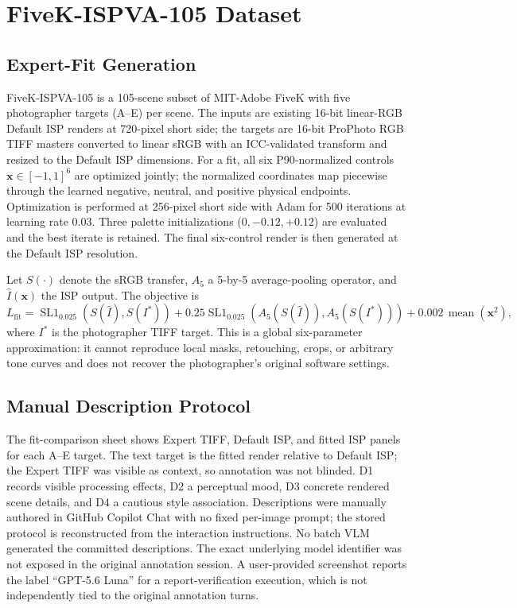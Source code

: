 \documentclass[journal]{IEEEtran}
\begin{document}
\section{FiveK-ISPVA-105 Dataset}
\subsection{Expert-Fit Generation}
FiveK-ISPVA-105 is a 105-scene subset of MIT-Adobe FiveK with five photographer targets (A--E) per scene. The inputs are existing 16-bit linear-RGB Default ISP renders at 720-pixel short side; the targets are 16-bit ProPhoto RGB TIFF masters converted to linear sRGB with an ICC-validated transform and resized to the Default ISP dimensions. For a fit, all six P90-normalized controls $\mathbf{x}\in[-1,1]^6$ are optimized jointly; the normalized coordinates map piecewise through the learned negative, neutral, and positive physical endpoints. Optimization is performed at 256-pixel short side with Adam for 500 iterations at learning rate 0.03. Three palette initializations ($0,-0.12,+0.12$) are evaluated and the best iterate is retained. The final six-control render is then generated at the Default ISP resolution.

Let $S(\cdot)$ denote the sRGB transfer, $A_5$ a 5-by-5 average-pooling operator, and $\hat I(\mathbf{x})$ the ISP output. The objective is
\begin{equation}
 L_{\mathrm{fit}}=\operatorname{SL1}_{0.025}(S(\hat I),S(I^*))
 +0.25\operatorname{SL1}_{0.025}(A_5(S(\hat I)),A_5(S(I^*)))
 +0.002\,\operatorname{mean}(\mathbf{x}^2),
\end{equation}
where $I^*$ is the photographer TIFF target. This is a global six-parameter approximation: it cannot reproduce local masks, retouching, crops, or arbitrary tone curves and does not recover the photographer's original software settings.

\subsection{Manual Description Protocol}
The fit-comparison sheet shows Expert TIFF, Default ISP, and fitted ISP panels for each A--E target. The text target is the fitted render relative to Default ISP; the Expert TIFF was visible as context, so annotation was not blinded. D1 records visible processing effects, D2 a perceptual mood, D3 concrete rendered scene details, and D4 a cautious style association. Descriptions were manually authored in GitHub Copilot Chat with no fixed per-image prompt; the stored protocol is reconstructed from the interaction instructions. No batch VLM generated the committed descriptions. The exact underlying model identifier was not exposed in the original annotation session. A user-provided screenshot reports the label ``GPT-5.6 Luna'' for a report-verification execution, which is not independently tied to the original annotation turns.
\end{document}
